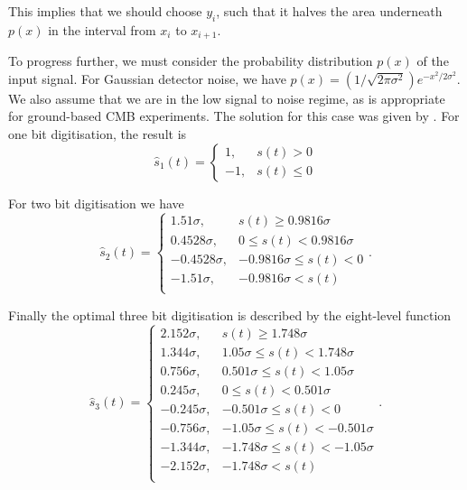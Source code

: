 \documentclass[apj]{emulateapj}
\begin{document}
This implies that we should choose $y_i$, such that it halves the area underneath $p(x)$ in the interval from $x_i$ to $x_{i+1}$.

To progress further, we must consider the probability distribution $p(x)$ of the input signal. For Gaussian detector noise, we have $p(x) = (1/\sqrt{2\pi\sigma^2}) e^{-x^2/2\sigma^2}$. We also assume that we are in the low signal to noise regime, as is appropriate for ground-based CMB experiments. The solution for this case was given by \cite{max1960}. For one bit digitisation, the result is
\begin{equation} \label{eq:1bit}
\hat{s}_1(t) = \left\{ \begin{array}{lr}
1, & s(t) > 0\\
-1, & s(t) \leq 0
\end{array} \right. \end{equation}

For two bit digitisation we have
\begin{equation}  \label{eq:2bit}
\hat{s}_2(t) = \left\{ \begin{array}{rl}
1.51 \sigma, & s(t) \geq 0.9816 \sigma\\
0.4528 \sigma, & 0 \leq s(t) < 0.9816 \sigma\\
-0.4528 \sigma, & -0.9816 \sigma \leq s(t) < 0\\
-1.51 \sigma, & -0.9816 \sigma < s(t)\\
\end{array} \right. . \end{equation}

Finally the optimal three bit digitisation is described by the eight-level function
\begin{equation}  \label{eq:3bit}
\hat{s}_3(t) = \left\{ \begin{array}{rl}
2.152 \sigma, & s(t) \geq 1.748 \sigma\\
1.344 \sigma, & 1.05 \sigma \leq s(t) < 1.748 \sigma\\
0.756 \sigma, & 0.501 \sigma \leq s(t) < 1.05 \sigma\\
0.245 \sigma, & 0 \leq s(t) < 0.501 \sigma\\
-0.245 \sigma, & -0.501 \sigma \leq s(t) < 0\\
-0.756 \sigma, & -1.05 \sigma \leq s(t) < -0.501 \sigma\\
-1.344 \sigma, & -1.748 \sigma \leq s(t) < -1.05 \sigma\\
-2.152 \sigma, & -1.748 \sigma < s(t)\\
\end{array} \right. . \end{equation}
\end{document}
